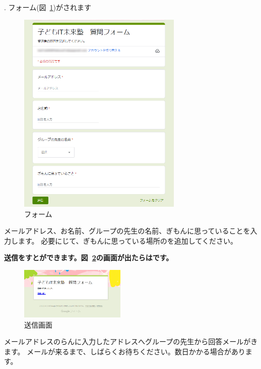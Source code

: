 \bigskip
{}.
フォーム(図~\ref{fig:52})がされます

\centering
\begin{figure}[H]
  \begin{minipage}{\textwidth}
    {\upshape
      \includegraphics[width=0.7\textwidth]{text01-img/textbook-img246.png}
      \caption{フォーム}\label{fig:52}
    }
  \end{minipage}  
\end{figure}

\flushleft

\bigskip

メールアドレス、お名前、グループの先生の名前、ぎもんに思っていることを入力します。
必要にじて、ぎもんに思っている場所のを追加してください。

{\bfseries
送信\textmd{をすとができます。図~\ref{fig:53}の画面が出たらはです。}}



\centering
\begin{figure}[H]
  \begin{minipage}{\textwidth}
    {\upshape
      \includegraphics[width=0.45\textwidth]{text01-img/textbook-img247.png}
      \caption{送信画面}\label{fig:53}
    }
  \end{minipage}  
\end{figure}

\flushleft
メールアドレスのらんに入力したアドレスへグループの先生から回答メールがきます。
メールが来るまで、しばらくお待ちください。数日かかる場合があります。

